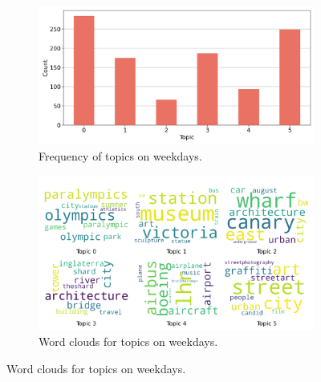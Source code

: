 \documentclass{article}
\theoremstyle{definition}
\theoremstyle{remark}
\begin{document}
\begin{figure}[!h]
    \centering
    \begin{subfigure}{0.45\textwidth}
        \centering
        \includegraphics[width=\linewidth]{figures/places_sense_weekday_tourists.png} 
        \caption{Frequency of topics on weekdays.}
        \label{fig:places_sense_weekday_tourists}
    \end{subfigure}
    \hfill
    \begin{subfigure}{0.5\textwidth}
        \centering
        \includegraphics[width=\linewidth]{figures/topics_weekday_tourists.png} 
        \caption{Word clouds for topics on weekdays.}
        \label{fig:topics_weekday_tourists}
    \end{subfigure}


\end{figure}
\end{document}
